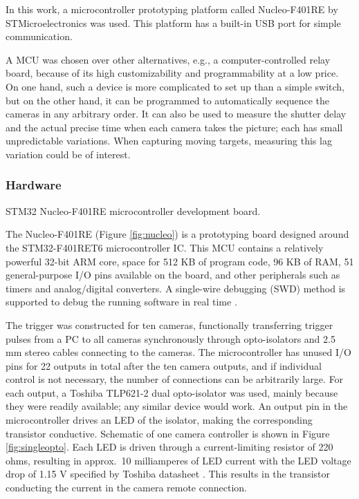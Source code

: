 In this work, a microcontroller prototyping platform called Nucleo-F401RE by STMicroelectronics \cite{stnucleo} was used.
This platform has a built-in USB port for simple communication.

A MCU was chosen over other alternatives, e.g., a computer-controlled relay board, because of its high customizability and programmability at a low price.
On one hand, such a device is more complicated to set up than a simple switch, but on the other hand, it can be programmed to automatically sequence the cameras in any arbitrary order.
It can also be used to measure the shutter delay and the actual precise time when each camera takes the picture; each has small unpredictable variations.
When capturing moving targets, measuring this lag variation could be of interest.

\subsubsection{Hardware}

{STM32 Nucleo-F401RE microcontroller development board.}

The Nucleo-F401RE (Figure \ref{fig:nucleo}) is a prototyping board designed around the STM32-F401RET6 microcontroller IC.
This MCU contains a relatively powerful 32-bit ARM core, space for 512 KB of program code, 96 KB of RAM, 51 general-purpose I/O pins available on the board, and other peripherals such as timers and analog/digital converters.
A single-wire debugging (SWD) method is supported to debug the running software in real time \cite{stnucleo}.

The trigger was constructed for ten cameras, functionally transferring trigger pulses from a PC to all cameras synchronously through opto-isolators and 2.5 mm stereo cables connecting to the cameras.
The microcontroller has unused I/O pins for 22 outputs in total after the ten camera outputs, and if individual control is not necessary, the number of connections can be arbitrarily large.
For each output, a Toshiba TLP621-2 dual opto-isolator was used, mainly because they were readily available; any similar device would work.
An output pin in the microcontroller drives an LED of the isolator, making the corresponding transistor conductive.
Schematic of one camera controller is shown in Figure \ref{fig:singleopto}.
Each LED is driven through a current-limiting resistor of 220 ohms, resulting in approx.\ 10 milliamperes of LED current with the LED voltage drop of 1.15 V specified by Toshiba datasheet \cite{tlp621}.
This results in the transistor conducting the current in the camera remote connection.

